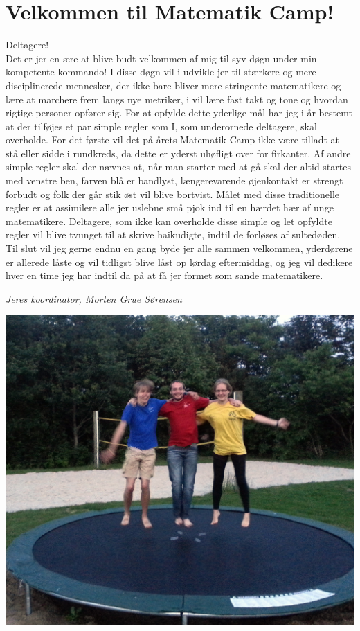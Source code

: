 \begin{minipage}[b]{0.95\linewidth}
\begin{minipage}[t]{0.47\textwidth}
\section*{Velkommen til Matematik Camp!}
Deltagere!\\
Det er jer en ære at blive budt velkommen af mig til syv døgn under min kompetente kommando! I disse døgn vil i udvikle jer til stærkere og mere disciplinerede mennesker, der ikke bare bliver mere stringente matematikere og lære at marchere frem langs nye metriker, i vil lære fast takt og tone og hvordan rigtige personer opfører sig. For at opfylde dette yderlige mål har jeg i år bestemt at der tilføjes et par simple regler som I, som underornede deltagere, skal overholde. For det første vil det på årets Matematik Camp ikke være tilladt at stå eller sidde i rundkreds, da dette er yderst uhøfligt over for firkanter. Af andre simple regler skal der nævnes at, når man starter med at gå skal der altid startes med venstre ben, farven blå er bandlyst, længerevarende øjenkontakt er strengt forbudt og folk der går stik øst vil blive bortvist. Målet med disse traditionelle regler er at assimilere alle jer uslebne små pjok ind til en hærdet hær af unge matematikere. Deltagere, som ikke kan overholde disse simple og let opfyldte regler vil blive tvunget til at skrive haikudigte, indtil de forløses af sultedøden. Til slut vil jeg gerne endnu en gang byde jer alle sammen velkommen, yderdørene er allerede låste og vil tidligst blive låst op lørdag eftermiddag, og jeg vil dedikere hver en time jeg har indtil da på at få jer formet som sande matematikere.

{\flushright\emph{Jeres koordinator, Morten Grue Sørensen}}

\begin{center}
\includegraphics[width=\linewidth]{koordinatorer2.jpg}
\end{center}

\end{minipage}
\end{minipage}
